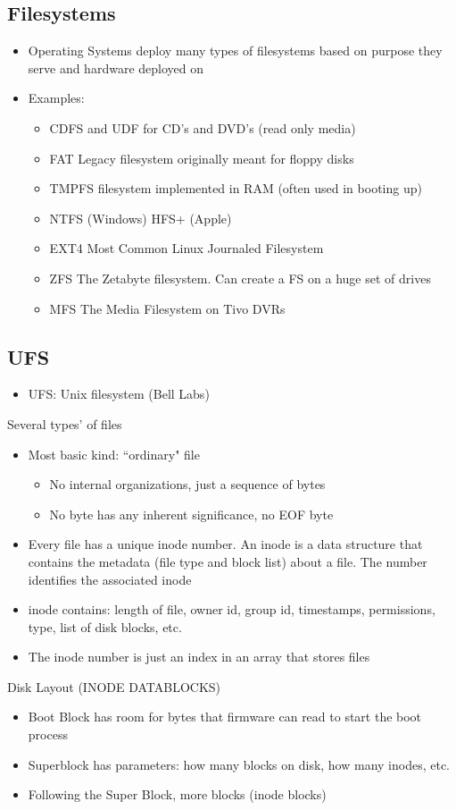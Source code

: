 \subsection{Filesystems}
\begin{itemize}
    \item Operating Systems deploy many types of filesystems based on purpose they serve and hardware deployed on
    \item Examples:
    \begin{itemize}
        \item CDFS and UDF for CD's and DVD's (read only media)
        \item FAT Legacy filesystem originally meant for floppy disks
        \item TMPFS filesystem implemented in RAM (often used in booting up)
        \item NTFS (Windows) HFS+ (Apple)
        \item EXT4 Most Common Linux Journaled Filesystem
        \item ZFS The Zetabyte filesystem. Can create a FS on a huge set of drives
        \item MFS The Media Filesystem on Tivo DVRs
    \end{itemize}
\end{itemize}

\subsection{UFS}
\begin{itemize}
    \item UFS: Unix filesystem (Bell Labs)
\end{itemize}
Several types' of files
\begin{itemize}
    \item Most basic kind: ``ordinary" file
    \begin{itemize}
        \item No internal organizations, just a sequence of bytes
        \item No byte has any inherent significance, no EOF byte
    \end{itemize}
    \item Every file has a unique inode number. An inode is a data structure that contains the metadata (file type and block list) about a file. The number identifies the associated inode
    \item inode contains: length of file, owner id, group id, timestamps, permissions, type, list of disk blocks, etc.
    \item The inode number is just an index in an array that stores files
\end{itemize}
Disk Layout (INODE DATABLOCKS)
\begin{itemize}
    \item Boot Block has room for bytes that firmware can read to start the boot process
    \item Superblock has parameters: how many blocks on disk, how many inodes, etc.
    \item Following the Super Block, more blocks (inode blocks)
\end{itemize}
